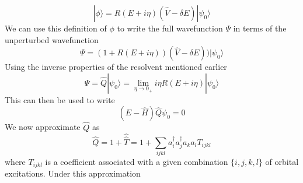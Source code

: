 \documentclass[12pt]{article}
\begin{document}
\begin{equation}
 |\phi \rangle = R(E + i\eta) (\hat{V}-\delta E)|\psi_{0} \rangle
\end{equation}
We can use this definition of $\phi$ to write the full wavefunction $\Psi$ in
terms of the unperturbed wavefunction
\begin{equation}
\Psi =  (1+ R(E + i\eta) )(\hat{V}-\delta E))|\psi_{0} \rangle
\end{equation}
Using the inverse properties of the resolvent mentioned earlier
\begin{equation}
\Psi = \hat{Q}|\psi_{0}\rangle = \lim_{\eta \rightarrow 0_{+}}i\eta R(E+i\eta)|\psi_{0}\rangle
\end{equation}
This can then be used to write
\begin{equation}
(E-\hat{H}) \hat{Q}\psi_{0}  = 0 
\label{eqn:proj} 
\end{equation}
We now approximate $\hat{Q}$ as 
\begin{equation}
\hat{Q} = 1 + \hat{\hat{T}} = 1 + \sum_{ijkl}a_{i}^{\dagger}a^{\dagger}_{j}a_{k}a_{l}T_{ijkl}
\end{equation}
where $T_{ijkl}$ is a coefficient associated with a given combination $\{i,j,k,l\}$ of orbital excitations. Under this
approximation 
\end{document}
